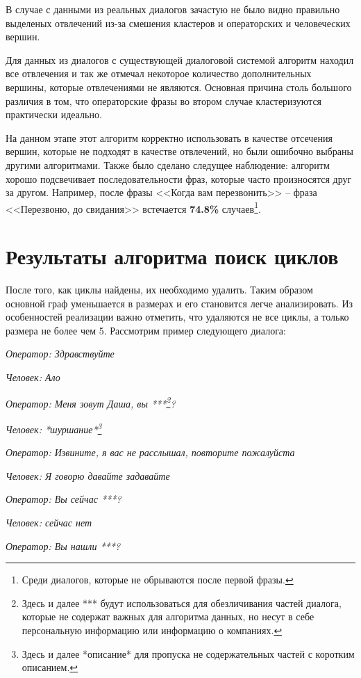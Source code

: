 \documentclass[times,specification,annotation]{itmo-student-thesis}
\begin{document}
	В случае с данными из реальных диалогов зачастую не было видно правильно выделеных отвлечений из-за смешения кластеров и операторских и человеческих вершин.
		
	Для данных из диалогов с существующей диалоговой системой алгоритм находил все отвлечения и так же отмечал некоторое количество дополнительных вершины, которые отвлечениями не являются. Основная причина столь большого различия в том, что операторские фразы во втором случае кластеризуются практически идеально. 
	
	На данном этапе этот алгоритм корректно использовать в качестве отсечения вершин, которые не подходят в качестве отвлечений, но были ошибочно выбраны другими алгоритмами. Также было сделано следущее наблюдение: алгоритм хорошо подсвечивает последовательности фраз, которые часто произносятся друг за другом. Например, после фразы <<Когда вам перезвонить>> -- фраза <<Перезвоню, до свидания>> встечается \textbf{74.8\%} случаев\footnote{Среди диалогов, которые не обрываются после первой фразы.}.
	
	\section{Результаты алгоритма поиск циклов}
	После того, как циклы найдены, их необходимо удалить. Таким образом основной граф уменьшается в размерах и его становится легче анализировать. Из особенностей реализации важно отметить, что удаляются не все циклы, а только размера не более чем 5. Рассмотрим пример следующего диалога:
	
	\textit{Оператор: Здравствуйте}
	
	\textit{Человек:  Ало}
	
	\textit{Оператор:  Меня зовут Даша, вы ***\footnote{Здесь и далее *** будут использоваться для обезличивания частей диалога, которые не содержат важных для алгоритма данных, но несут в себе персональную информацию или информацию о компаниях.}?}
	
	\textit{Человек:  *шуршание*\footnote{Здесь и далее *описание* для пропуска не содержательных частей с коротким описанием.}}
	
	\textit{Оператор:  Извините, я вас не расслышал, повторите пожалуйста}
	
	\textit{Человек:  Я говорю давайте задавайте}
	
	\textit{Оператор:  Вы сейчас ***?}
	
	\textit{Человек:  сейчас нет}
	
	\textit{Оператор:  Вы нашли ***?}
	
\end{document}
